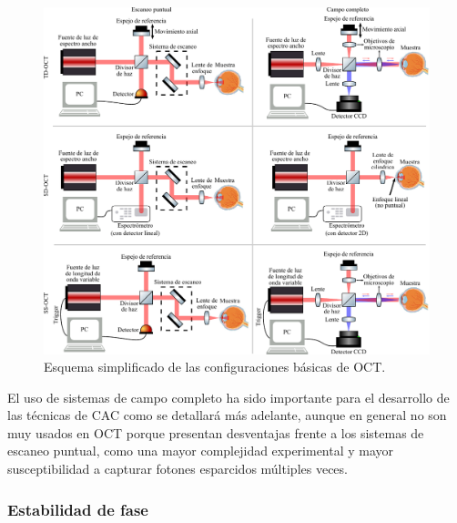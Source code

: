 \documentclass[letter, 12 pt]{article}
\begin{document}
\begin{figure}[h]
    \centering
    \includegraphics[width = \textwidth]{Anteproyecto/OCT_Schemes.pdf}
    \caption{Esquema simplificado de las configuraciones básicas de OCT.}
    \label{fig:OCT_schemes}
\end{figure}

El uso de sistemas de campo completo ha sido importante para el desarrollo de las técnicas de CAC como se detallará más adelante, aunque en general no son muy usados en OCT porque presentan desventajas frente a los sistemas de escaneo puntual, como una mayor complejidad experimental y mayor susceptibilidad a capturar fotones esparcidos múltiples veces.
		\subsubsection{Estabilidad de fase}
\end{document}

